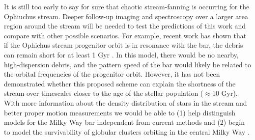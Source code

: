 \documentclass[numberedappendix]{emulateapj}
\newcommand{\todo}[1]{{\color{red} TODO: #1}}
\begin{document}
It is still too early to say for sure that chaotic stream-fanning is occurring for the Ophiuchus stream. Deeper follow-up imaging and spectroscopy over a larger area region around the stream will be needed to test the predictions of this work and compare with other possible scenarios. For example, recent work has shown that if the Ophichus stream progenitor orbit is in resonance with the bar, the debris can remain short for at least 1 Gyr \citep{hattori15}. In this model, there would be no nearby, high-dispersion debris, and the pattern speed of the bar would likely be related to the orbital frequencies of the progenitor orbit. However, it has not been demonstrated whether this proposed scheme can explain the shortness of the stream over timescales closer to the age of the stellar population ($\approx$10 Gyr). With more information about the density distribution of stars in the stream and better proper motion measurements we would be able to (1) help distinguish models for the Milky Way bar independent from current methods and (2) begin to model the survivability of globular clusters orbiting in the central Milky Way \citep[e.g.,][]{gnedin97}. 

%
%
%
%
%
%
\end{document}
